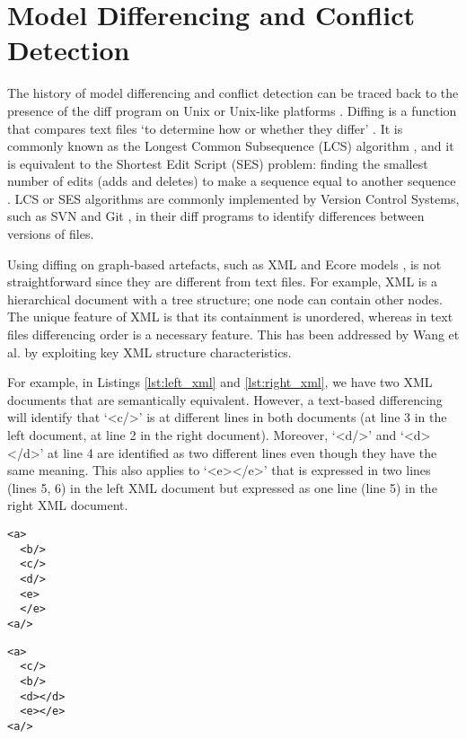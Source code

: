 \section{Model Differencing and Conflict Detection}
\label{sec:model_differencing_and_conflict_detection} 
The history of model differencing and conflict detection can be traced back to the presence of the \textsf{diff} program on Unix or Unix-like platforms \cite{hunt1976algorithm}. Diffing is a function that compares text files ‘to determine how or whether they differ’ \cite{diff}. It is commonly known as the Longest Common Subsequence (LCS) algorithm \cite{bergroth2000lcs}, and it is equivalent to the Shortest Edit Script (SES) problem: finding the smallest number of edits (adds and deletes) to make a sequence equal to another sequence \cite{DBLP:journals/algorithmica/Meyers86}. LCS or SES algorithms are commonly implemented by Version Control Systems, such as SVN \cite{svn-diff} and Git \cite{git-diff}, in their \textsf{diff} programs to identify differences between versions of files.

Using diffing on graph-based artefacts, such as XML \cite{w3c-xml} and Ecore models \cite{steinberg2008emf}, is not straightforward since they are different from text files. For example, XML is a hierarchical document with a tree structure; one node can contain other nodes. The unique feature of XML is that its containment is unordered, whereas in text files differencing order is a necessary feature. This has been addressed by Wang et al. \cite{wang2003xdiff} by exploiting key XML structure characteristics. 

For example, in Listings \ref{lst:left_xml} and \ref{lst:right_xml}, we have two XML documents that are semantically equivalent. However, a text-based differencing will identify that `<c/>' is at different lines in both documents (at line 3 in the left document, at line 2 in the right document). Moreover, `<d/>' and `<d></d>' at line 4 are identified as two different lines even though they have the same meaning. This also applies to `<e></e>' that is expressed in two lines (lines 5, 6) in the left XML document but expressed as one line (line 5) in the right XML document.

\vspace{-20pt}
\begin{minipage}[t]{0.49\linewidth}
\begin{lstlisting}[style=eol,caption={Left XML document.}, label=lst:left_xml]
<a>
  <b/>
  <c/>
  <d/>
  <e>
  </e>
<a/>
\end{lstlisting}
\end{minipage}
\hfill
\begin{minipage}[t]{0.49\linewidth}
  \begin{lstlisting}[style=eol,caption={Right XML document.}, label=lst:right_xml]
<a>
  <c/>
  <b/>
  <d></d>
  <e></e>
<a/>
  \end{lstlisting}
\end{minipage}


